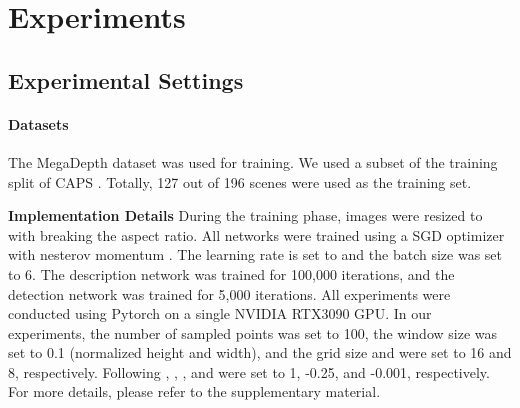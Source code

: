 \documentclass[10pt,twocolumn,letterpaper]{article}
\begin{document}
\begin{comment}
\textbf{First}, the heatmap predicted by the detection network is formulated as a probability distribution of  keypoints:

where  represents the probability of  to be selected as a keypoint within a grid cell and  denotes the keypoint score of location .
Then we sample one point per grid according to the probability distribution  as keypoint candidates.

\textbf{Second}, given two sets of keypoints  and , the similarities between the elements of  and  are calculated to formulate a similarity matrix :

Then, the matching probabilities  between  and  can be calculated as:

where  is a hyper-parameter. The larger  is, the more strict cycle consistency on  holds.

\textbf{Finally}, the loss function is computed based on  and : 

where  is a regularization penalty for all keypoint candidates, and we abuse  to denote both query and reference keypoints probability distribution. And the  can be defined as,

Here,  is the epipolar rewards for keypoint candidate  and   according to the matched pair ,and can be defined as,

\end{comment}


\section{Experiments}
\subsection{Experimental Settings}
\paragraph{Datasets} The MegaDepth dataset \cite{li2018megadepth} was used for training. We used a subset of the training split of CAPS \cite{wangLearningFeatureDescriptors2020}. Totally, 127 out of 196 scenes were used as the training set. 

\noindent\textbf{Implementation Details} 
During the training phase, images were resized to  with breaking the aspect ratio. All networks were trained using a SGD optimizer with nesterov momentum \cite{sutskever2013importance}. The learning rate is set to  and the batch size was set to 6. The description network was trained for 100,000 iterations, and the detection network was trained for 5,000 iterations. All experiments were conducted using Pytorch on a single NVIDIA RTX3090 GPU.
In our experiments, the number of sampled points  was set to 100, the window size  was set to 0.1 (normalized height and width), and the grid size  and  were set to 16 and 8, respectively. Following \cite{tyszkiewiczDISKLearningLocal2020a}, , , and  were set to 1, -0.25, and -0.001,  respectively. For more details, please refer to the supplementary material.
\end{document}
